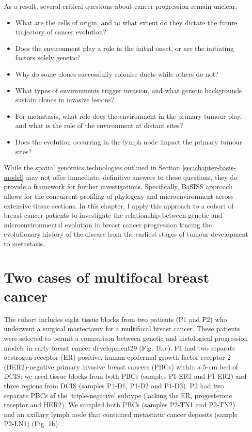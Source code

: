As a result, several critical questions about cancer progression remain unclear:

\begin{itemize}
    \item What are the cells of origin, and to what extent do they dictate the future trajectory of cancer evolution?
    \item Does the environment play a role in the initial onset, or are the initiating factors solely genetic?
    \item Why do some clones successfully colonise ducts while others do not?
    \item What types of environments trigger invasion, and what genetic backgrounds sustain clones in invasive lesions?
    \item For metastasis, what role does the environment in the primary tumour play, and what is the role of the environment at distant sites?
    \item Does the evolution occurring in the lymph node impact the primary tumour sites?
\end{itemize}

While the spatial genomics technologies outlined in Section \ref{sec:chapter-basis-model} may not offer immediate, definitive answers to these questions, they do provide a framework for further investigations. Specifically, \ac{BaSISS} approach allows for the concurrent profiling of phylogeny and microenvironment across extensive tissue sections. In this chapter, I apply this approach to a cohort of breast cancer patients to investigate the relationship between genetic and microenvironmental evolution in breast cancer progression tracing the evolutionary history of the disease from the earliest stages of tumour development to metastasis.

\section{Two cases of multifocal breast cancer}

The cohort includes eight tissue blocks from two patients (P1 and P2) who underwent a surgical mastectomy for a multifocal breast cancer. These patients were selected to permit a comparison between genetic and histological progression models in early breast cancer development29 (Fig. 1b,c). P1 had two separate oestrogen receptor (ER)-positive, human epidermal growth factor receptor 2 (HER2)-negative primary invasive breast cancers (PBCs) within a 5-cm bed of DCIS; we used tissue blocks from both PBCs (samples P1-ER1 and P1-ER2) and three regions from DCIS (samples P1-D1, P1-D2 and P1-D3). P2 had two separate PBCs of the ‘triple-negative’ subtype (lacking the ER, progesterone receptor and HER2). We sampled both PBCs (samples P2-TN1 and P2-TN2) and an axillary lymph node that contained metastatic cancer deposits (sample P2-LN1) (Fig. 1b).

